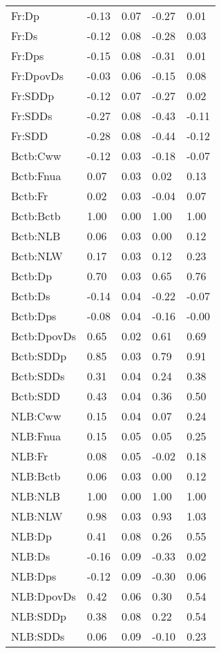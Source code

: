 \begin{center}
\begin{longtable}{|p{0.9in}|p{0.7in}|p{0.7in}|p{0.7in}|p{0.7in}|}
  Fr:Dp & -0.13 & 0.07 & -0.27 & 0.01 \\ 
  Fr:Ds & -0.12 & 0.08 & -0.28 & 0.03 \\ 
  Fr:Dps & -0.15 & 0.08 & -0.31 & 0.01 \\ 
  Fr:DpovDs & -0.03 & 0.06 & -0.15 & 0.08 \\ 
  Fr:SDDp & -0.12 & 0.07 & -0.27 & 0.02 \\ 
  Fr:SDDs & -0.27 & 0.08 & -0.43 & -0.11 \\ 
  Fr:SDD & -0.28 & 0.08 & -0.44 & -0.12 \\ 
  Bctb:Cww & -0.12 & 0.03 & -0.18 & -0.07 \\ 
  Bctb:Fnua & 0.07 & 0.03 & 0.02 & 0.13 \\ 
  Bctb:Fr & 0.02 & 0.03 & -0.04 & 0.07 \\ 
  Bctb:Bctb & 1.00 & 0.00 & 1.00 & 1.00 \\ 
  Bctb:NLB & 0.06 & 0.03 & 0.00 & 0.12 \\ 
  Bctb:NLW & 0.17 & 0.03 & 0.12 & 0.23 \\ 
  Bctb:Dp & 0.70 & 0.03 & 0.65 & 0.76 \\ 
  Bctb:Ds & -0.14 & 0.04 & -0.22 & -0.07 \\ 
  Bctb:Dps & -0.08 & 0.04 & -0.16 & -0.00 \\ 
  Bctb:DpovDs & 0.65 & 0.02 & 0.61 & 0.69 \\ 
  Bctb:SDDp & 0.85 & 0.03 & 0.79 & 0.91 \\ 
  Bctb:SDDs & 0.31 & 0.04 & 0.24 & 0.38 \\ 
  Bctb:SDD & 0.43 & 0.04 & 0.36 & 0.50 \\ 
  NLB:Cww & 0.15 & 0.04 & 0.07 & 0.24 \\ 
  NLB:Fnua & 0.15 & 0.05 & 0.05 & 0.25 \\ 
  NLB:Fr & 0.08 & 0.05 & -0.02 & 0.18 \\ 
  NLB:Bctb & 0.06 & 0.03 & 0.00 & 0.12 \\ 
  NLB:NLB & 1.00 & 0.00 & 1.00 & 1.00 \\ 
  NLB:NLW & 0.98 & 0.03 & 0.93 & 1.03 \\ 
  NLB:Dp & 0.41 & 0.08 & 0.26 & 0.55 \\ 
  NLB:Ds & -0.16 & 0.09 & -0.33 & 0.02 \\ 
  NLB:Dps & -0.12 & 0.09 & -0.30 & 0.06 \\ 
  NLB:DpovDs & 0.42 & 0.06 & 0.30 & 0.54 \\ 
  NLB:SDDp & 0.38 & 0.08 & 0.22 & 0.54 \\ 
  NLB:SDDs & 0.06 & 0.09 & -0.10 & 0.23 \\ 

\end{longtable}
\end{center}

